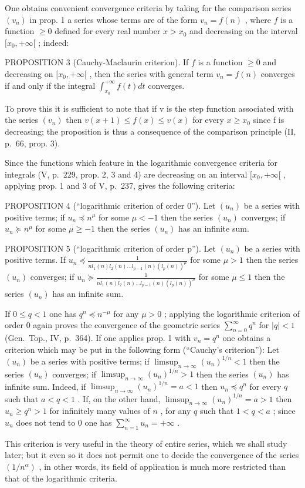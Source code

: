 One obtains convenient convergence criteria by taking for the comparison series \((v_{n})\) in prop. 1 a series whose terms are of the form \(v_{n} = f(n)\) , where \(f\) is a function \(\geqslant 0\) defined for every real number \(x > x_0\) and decreasing on the interval \([x_0, +\infty[\) ; indeed:

PROPOSITION 3 (Cauchy-Maclaurin criterion). If \(f\) is a function \(\geqslant 0\) and decreasing on \([x_0, +\infty[\) , then the series with general term \(v_n = f(n)\) converges if and only if the integral \(\int_{x_0}^{+\infty} f(t) dt\) converges.

To prove this it is sufficient to note that if v is the step function associated with the series \((v_{n})\) then \(v(x+1) \leqslant f(x) \leqslant v(x)\) for every \(x \geqslant x_{0}\) since f is decreasing; the proposition is thus a consequence of the comparison principle (II, p.~66, prop. 3).

Since the functions which feature in the logarithmic convergence criteria for integrals (V, p.~229, prop. 2, 3 and 4) are decreasing on an interval \([x_{0}, +\infty[\) , applying prop. 1 and 3 of V, p.~237, gives the following criteria:

PROPOSITION 4 (``logarithmic criterion of order 0''). Let \((u_{n})\) be a series with positive terms; if \(u_{n} \preccurlyeq n^{\mu}\) for some \(\mu < -1\) then the series \((u_{n})\) converges; if \(u_{n} \succcurlyeq n^{\mu}\) for some \(\mu \geqslant -1\) then the series \((u_{n})\) has an infinite sum.

PROPOSITION 5 (``logarithmic criterion of order p''). Let \((u_{n})\) be a series with positive terms. If \(u_{n} \preccurlyeq \frac{1}{nl_{1}(n)l_{2}(n)\ldots l_{p-1}(n)(l_{p}(n))^{\mu}}\) for some \(\mu > 1\) then the series \((u_{n})\) converges; if \(u_{n} \succcurlyeq \frac{1}{nl_{1}(n)l_{2}(n)\ldots l_{p-1}(n)(l_{p}(n))^{\mu}}\) for some \(\mu \leqslant 1\) then the series \((u_{n})\) has an infinite sum.

If \(0 \leqslant q < 1\) one has \(q^n \preccurlyeq n^{-\mu}\) for any \(\mu > 0\) ; applying the logarithmic criterion of order 0 again proves the convergence of the geometric series \(\sum_{n=0}^{\infty} q^n\) for \(|q| < 1\) (Gen.~Top., IV, p.~364). If one applies prop. 1 with \(v_n = q^n\) one obtains a criterion which may be put in the following form (``Cauchy's criterion''): Let \((u_n)\) be a series with positive terms; if \(\limsup_{n \to \infty} (u_n)^{1/n} < 1\) then the series \((u_n)\) converges; if \(\limsup_{n \to \infty} (u_n)^{1/n} > 1\) then the series \((u_n)\) has infinite sum. Indeed, if \(\limsup_{n \to \infty} (u_n)^{1/n} = a < 1\) then \(u_n \preccurlyeq q^n\) for every \(q\) such that \(a < q < 1\) . If, on the other hand, \(\limsup_{n \to \infty} (u_n)^{1/n} = a > 1\) then \(u_n \geqslant q^n > 1\) for infinitely many values of \(n\) , for any \(q\) such that \(1 < q < a\) ; since \(u_n\) does not tend to 0 one has \(\sum_{n=1}^{\infty} u_n = +\infty\) .

This criterion is very useful in the theory of entire series, which we shall study later; but it even so it does not permit one to decide the convergence of the series \((1/n^{\alpha})\) , in other words, its field of application is much more restricted than that of the logarithmic criteria.

